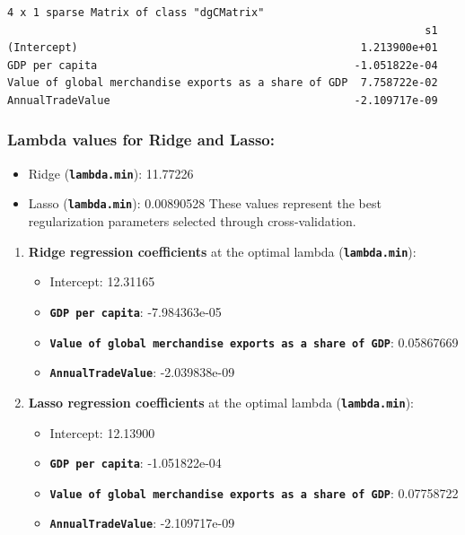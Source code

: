 \documentclass[
  10pt,
]{article}
\begin{document}
\begin{verbatim}
4 x 1 sparse Matrix of class "dgCMatrix"
                                                                 s1
(Intercept)                                            1.213900e+01
GDP per capita                                        -1.051822e-04
Value of global merchandise exports as a share of GDP  7.758722e-02
AnnualTradeValue                                      -2.109717e-09
\end{verbatim}

\subsubsection{\texorpdfstring{\textbf{Lambda values for Ridge and
Lasso}:}{Lambda values for Ridge and Lasso:}}\label{lambda-values-for-ridge-and-lasso}

\begin{itemize}
\item
  Ridge (\textbf{\texttt{lambda.min}}): 11.77226
\item
  Lasso (\textbf{\texttt{lambda.min}}): 0.00890528 These values
  represent the best regularization parameters selected through
  cross-validation.
\end{itemize}

\begin{enumerate}
\def\labelenumi{\arabic{enumi}.}
\item
  \textbf{Ridge regression coefficients} at the optimal lambda
  (\textbf{\texttt{lambda.min}}):

  \begin{itemize}
  \item
    Intercept: 12.31165
  \item
    \textbf{\texttt{GDP\ per\ capita}}: -7.984363e-05
  \item
    \textbf{\texttt{Value\ of\ global\ merchandise\ exports\ as\ a\ share\ of\ GDP}}:
    0.05867669
  \item
    \textbf{\texttt{AnnualTradeValue}}: -2.039838e-09
  \end{itemize}
\item
  \textbf{Lasso regression coefficients} at the optimal lambda
  (\textbf{\texttt{lambda.min}}):

  \begin{itemize}
  \item
    Intercept: 12.13900
  \item
    \textbf{\texttt{GDP\ per\ capita}}: -1.051822e-04
  \item
    \textbf{\texttt{Value\ of\ global\ merchandise\ exports\ as\ a\ share\ of\ GDP}}:
    0.07758722
  \item
    \textbf{\texttt{AnnualTradeValue}}: -2.109717e-09
  \end{itemize}
\end{enumerate}
\end{document}
